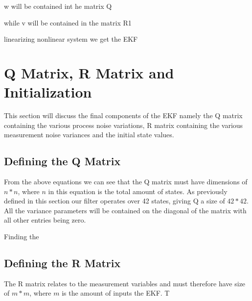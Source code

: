 w will be contained int he matrix Q

while v will be contained in the matrix R1


linearizing nonlinear system we get the EKF


\section{Q Matrix, R Matrix and Initialization}
This section will discuss the final components of the EKF namely the Q matrix containing the various process noise variations, R matrix containing the various measurement noise variances and the initial state values.

\subsection{Defining the Q Matrix}
From the above equations we can see that the Q matrix must have dimensions of $n*n$, where $n$ in this equation is the total amount of states. As previously defined in this section our filter operates over 42 states, giving Q a size of $42*42$. All the variance parameters will be contained on the diagonal of the matrix with all other entries being zero.

Finding the 

\subsection{Defining the R Matrix}
The R matrix relates to the measurement variables and must therefore have size of $m*m$, where $m$ is the amount of inputs the EKF. T








